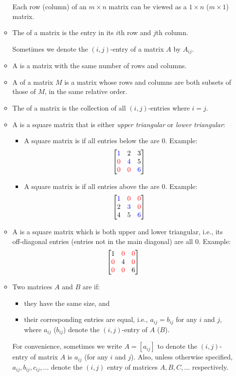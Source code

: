 \begin{enumerate}
\begin{itemize}
\begin{note}
Each row (column) of an \(m\times n\) matrix can be viewed as a \(1\times n\)
(\(m\times 1\)) matrix.
\end{note}
\item The  of a matrix is the entry in its \(i\)th row
and \(j\)th column. \begin{note}
Sometimes we denote the \((i,j)\)-entry of a matrix \(A\) by \(A_{ij}\).
\end{note}
\item A  is a matrix with the same number of rows and columns.
\item A  of a matrix \(M\) is a matrix whose rows and columns
are both subsets of those of \(M\), in the same relative order.
\item The  of a matrix is the collection of all
\((i,j)\)-entries where \(i=j\).
\item A  is a square matrix that is either \emph{upper
triangular} or \emph{lower triangular}:
\begin{itemize}
\item A square matrix is  if all entries below the  are \(0\). Example:
\[
\mqty[\blc{1}&2&3\\ \rc{0}&\blc{4}&5\\ \rc{0}&\rc{0}&\blc{6}]
\]
\item A square matrix is  if all entries above the  are \(0\). Example:
\[
\mqty[\blc{1}&\rc{0}&\rc{0}\\2&\blc{3}&\rc{0}\\ 4&5&\blc{6}]
\]
\end{itemize}
\item A  is a square matrix which is both upper and lower
triangular, i.e., its off-diagonal entries (entries not in the main diagonal)
are all \(0\).
Example:
\[
\mqty[1&\rc{0}&\rc{0}\\ \rc{0}&4&\rc{0}\\ \rc{0}&\rc{0}&6]
\]
\item Two matrices \(A\) and \(B\) are  if:
\begin{itemize}
\item they have the same size, and
\item their corresponding entries are equal, i.e., \(a_{ij}=b_{ij}\) for any
\(i\) and \(j\), where \(a_{ij}\) (\(b_{ij}\)) denote the \((i,j)\)-entry of
\(A\) (\(B\)).
\end{itemize}
\begin{note}
For convenience, sometimes we write \(A=[a_{ij}]\) to denote the
\((i,j)\)-entry of matrix \(A\) is \(a_{ij}\) (for any \(i\) and \(j\)). Also,
unless otherwise specified, \(a_{ij},b_{ij},c_{ij},\dotsc\) denote the
\((i,j)\) entry of matrices \(A,B,C,\dotsc\) respectively.
\end{note}
\end{itemize}
\end{enumerate}
